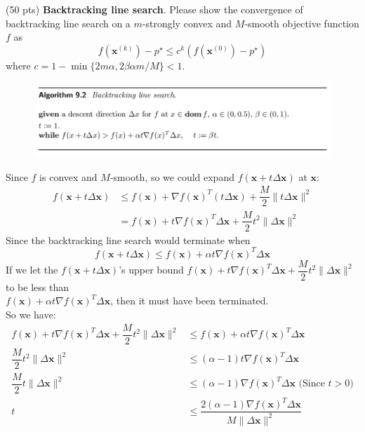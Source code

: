 \item {\color{red} (50 pts)} \textbf{Backtracking line search}. Please show the convergence of backtracking line search on a $m$-strongly convex and $M$-smooth objective function $f$ as
$$
f\left(\mathbf{x}^{(k)}\right)-p^{\star} \leq c^k\left(f\left(\mathbf{x}^{(0)}\right)-p^{\star}\right)
$$
where $c=1-\min \{2 m \alpha, 2 \beta \alpha m / M\}<1$.

\begin{figure}[htbp]
    \centering
	\includegraphics[width=1\textwidth]{./image/backtracking.png}
\end{figure}

\solution{}
Since $f$ is convex and $M$-smooth, so we could expand $f(\mathbf{x}+t\Delta \mathbf{x})$ at $\mathbf{x}$:
\begin{align*}
    f(\mathbf{x}+t\Delta \mathbf{x}) &\leq f(\mathbf{x})+\nabla f(\mathbf{x})^T(t\Delta\mathbf{x}) +\dfrac{M}{2}\|t\Delta \mathbf{x}\|^2\\
    &= f(\mathbf{x})+t\nabla f(\mathbf{x})^T\Delta \mathbf{x}+\dfrac{M}{2}t^2\|\Delta \mathbf{x}\|^2
\end{align*}
Since the backtracking line search would terminate when
$$f(\mathbf{x}+t\Delta \mathbf{x})\leq f(\mathbf{x})+\alpha t\nabla f(\mathbf{x})^T\Delta \mathbf{x}$$
If we let the $f(\mathbf{x}+t\Delta \mathbf{x})$'s upper bound 
$f(\mathbf{x})+t\nabla f(\mathbf{x})^T\Delta \mathbf{x}+\dfrac{M}{2}t^2\|\Delta \mathbf{x}\|^2$ to be less than\\
$f(\mathbf{x})+\alpha t\nabla f(\mathbf{x})^T\Delta \mathbf{x}$, then it must have been terminated.\\
So we have:
\begin{align*}
    f(\mathbf{x})+t\nabla f(\mathbf{x})^T\Delta \mathbf{x}+\dfrac{M}{2}t^2\|\Delta \mathbf{x}\|^2 &\leq f(\mathbf{x})+\alpha t\nabla f(\mathbf{x})^T\Delta \mathbf{x} \\
    \dfrac{M}{2}t^2\|\Delta \mathbf{x}\|^2 &\leq (\alpha-1) t\nabla f(\mathbf{x})^T\Delta \mathbf{x} \\
    \dfrac{M}{2}t\|\Delta \mathbf{x}\|^2 &\leq (\alpha-1)\nabla f(\mathbf{x})^T\Delta \mathbf{x} \text{\ \ \ \ \ \ \ \ \ \ \ \ (Since $t>0$)}\\
    t &\leq \dfrac{2(\alpha-1)\nabla f(\mathbf{x})^T\Delta \mathbf{x}}{M\|\Delta \mathbf{x}\|^2}
\end{align*}


